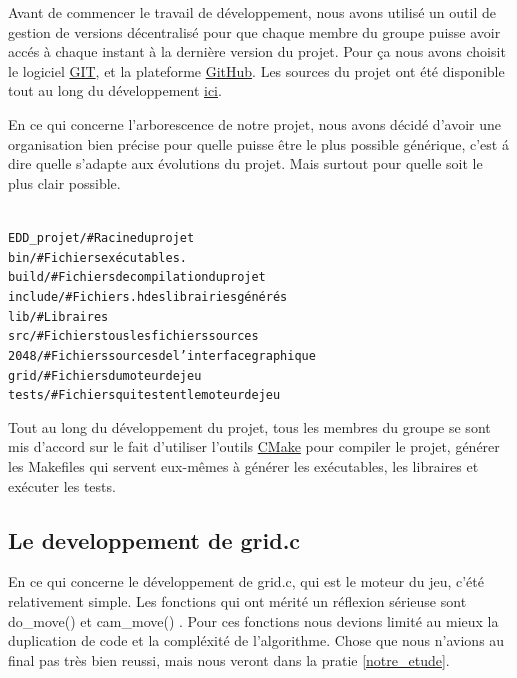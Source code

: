 \documentclass[12pt]{article}
\begin{document}
Avant de commencer le travail de d\'eveloppement, nous avons utilis\'e un
outil de gestion de versions d\'ecentralis\'e pour que chaque membre du groupe
puisse avoir acc\'es \`a chaque instant \`a la derni\`ere version du projet.
Pour ça nous avons choisit le logiciel \href{http://git-scm.com/}{GIT}, et la plateforme
\href{http://github.com/}{GitHub}. Les sources du projet ont \'et\'e disponible tout
au long du d\'eveloppement \href{http://github.com/kamneo/EDD_project}{ici}.\par

En ce qui concerne l'arborescence de notre projet, nous avons d\'ecid\'e d'avoir
une organisation bien pr\'ecise pour quelle puisse \^etre le plus possible
g\'en\'erique, c'est \'a dire quelle s'adapte aux \'evolutions du projet.
Mais surtout pour quelle soit le plus clair possible.

\begin{alltt}
{\color{gray}
EDD_projet/        # Racine du projet
    bin/           # Fichiers ex\'ecutables.
    build/         # Fichiers de compilation du projet
    include/       # Fichiers .h des librairies g\'en\'er\'es
    lib/           # Libraires
    src/           # Fichiers tous les fichiers sources
        2048/      # Fichiers sources de l'interface graphique
        grid/      # Fichiers du moteur de jeu
            tests/ # Fichiers qui testent le moteur de jeu
}
\end{alltt}

\par

Tout au long du d\'eveloppement du projet, tous les membres du groupe se sont
mis d'accord sur le fait d'utiliser l'outils \href{http://www.cmake.org/}{CMake}
pour compiler le projet, g\'en\'erer les Makefiles qui servent eux-m\^emes \`a g\'en\'erer les
ex\'ecutables, les libraires et ex\'ecuter les tests.

\subsection{Le developpement de grid.c}
En ce qui concerne le d\'eveloppement de grid.c, qui est le moteur du jeu,
c'\'et\'e relativement simple. Les fonctions qui ont m\'erit\'e un r\'eflexion
s\'erieuse sont \og do\_move() \fg{} et \og cam\_move() \fg{}. Pour ces
fonctions nous devions limit\'e au mieux la duplication de code et la compl\'exit\'e de
l'algorithme. Chose que nous n'avions au final pas tr\`es bien reussi, mais nous
veront dans la pratie \ref{notre_etude}.
\end{document}
